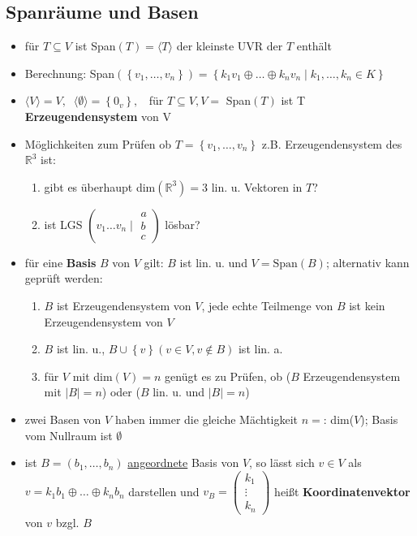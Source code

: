 \documentclass[10pt,a4paper]{article}
\begin{document}
\subsection{Spanräume und Basen}
\begin{itemize}
\item für $T\subseteq V$ ist Span$(T)=\langle T \rangle$ der kleinste UVR der $T$ enthält \item Berechnung: Span$(\left\lbrace v_{1},\dotsc ,v_{n}\right\rbrace)=\left\lbrace k_{1}v_{1}\oplus \dotsc \oplus k_{n}v_{n}\mid k_{1},\dotsc ,k_{n} \in K\right\rbrace $
\item $\langle V\rangle =V, \;\; \langle \emptyset \rangle =\left\lbrace 0_{v} \right\rbrace,\;\;$ für $T\subseteq V,V=$ Span$(T)$ ist T \textbf{Erzeugendensystem} von V
\item Möglichkeiten zum Prüfen ob $T=\left\lbrace  v_{1}, \dotsc, v_{n} \right\rbrace$ z.B. Erzeugendensystem des $\mathbb{R}^{3}$ ist: 
\begin{enumerate}
\item gibt es überhaupt dim$(\mathbb{R}^3)=3$ lin. u. Vektoren in $T$?
\item ist LGS $\left(v_{1} \dotsc v_{n} \mid \begin{matrix} a\\  b\\c\end{matrix}\right)$ lösbar? 
\end{enumerate}
\item für eine \textbf{Basis} $B$ von $V$ gilt: $B$ ist lin. u. und $V=\text{Span}(B)$; alternativ kann geprüft werden: \begin{enumerate}
\item $B$ ist Erzeugendensystem von $V$, jede echte Teilmenge von $B$ ist kein Erzeugendensystem von $V$
\item $B$ ist lin. u., $B\cup \left\lbrace v \right\rbrace (v \in V,v\not\in B)$ ist lin. a. 
\item für $V$ mit dim$(V)=n$ genügt es zu Prüfen, ob ($B$ Erzeugendensystem mit $\vert B\vert=n$) oder ($B$ lin. u. und $\vert B\vert=n$)
\end{enumerate}
\item zwei Basen von $V$ haben immer die gleiche Mächtigkeit $n=:\, $dim($V$); Basis vom Nullraum ist $\emptyset$
\item ist $B=(b_{1},\dotsc,b_{n})$ \underline{angeordnete} Basis von $V$, so lässt sich $v\in V$ als $v=k_{1}b_{1}\oplus\dotsc  \oplus k_{n}b_{n}$ darstellen und $v_{B}=\begin{pmatrix} k_{1}\\ \vdots\\ k_{n} \end{pmatrix}$ heißt \textbf{Koordinatenvektor} von $v$ bzgl. $B$ 
\end{itemize}
\end{document}
